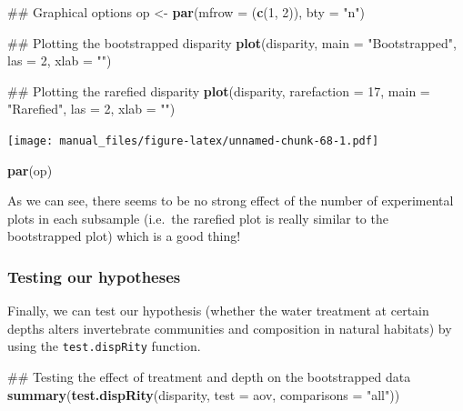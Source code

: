 \documentclass[]{book}
\newenvironment{Shaded}{\begin{snugshade}}{\end{snugshade}}
\newcommand{\KeywordTok}[1]{\textcolor[rgb]{0.13,0.29,0.53}{\textbf{#1}}}
\newcommand{\DataTypeTok}[1]{\textcolor[rgb]{0.13,0.29,0.53}{#1}}
\newcommand{\DecValTok}[1]{\textcolor[rgb]{0.00,0.00,0.81}{#1}}
\newcommand{\StringTok}[1]{\textcolor[rgb]{0.31,0.60,0.02}{#1}}
\newcommand{\NormalTok}[1]{#1}
\theoremstyle{definition}
\theoremstyle{definition}
\theoremstyle{remark}
\begin{document}
\begin{Shaded}
\begin{Highlighting}[]
\NormalTok{## Graphical options}
\NormalTok{op <-}\StringTok{ }\KeywordTok{par}\NormalTok{(}\DataTypeTok{mfrow =}\NormalTok{ (}\KeywordTok{c}\NormalTok{(}\DecValTok{1}\NormalTok{, }\DecValTok{2}\NormalTok{)), }\DataTypeTok{bty =} \StringTok{"n"}\NormalTok{)}

\NormalTok{## Plotting the bootstrapped disparity}
\KeywordTok{plot}\NormalTok{(disparity, }\DataTypeTok{main =} \StringTok{"Bootstrapped"}\NormalTok{, }\DataTypeTok{las =} \DecValTok{2}\NormalTok{, }\DataTypeTok{xlab =} \StringTok{""}\NormalTok{)}

\NormalTok{## Plotting the rarefied disparity}
\KeywordTok{plot}\NormalTok{(disparity, }\DataTypeTok{rarefaction =} \DecValTok{17}\NormalTok{, }\DataTypeTok{main =} \StringTok{"Rarefied"}\NormalTok{, }\DataTypeTok{las =} \DecValTok{2}\NormalTok{, }\DataTypeTok{xlab =} \StringTok{""}\NormalTok{)}
\end{Highlighting}
\end{Shaded}

\texttt{[image: manual\_files/figure-latex/unnamed-chunk-68-1.pdf]}

\begin{Shaded}
\begin{Highlighting}[]
\KeywordTok{par}\NormalTok{(op)}
\end{Highlighting}
\end{Shaded}

As we can see, there seems to be no strong effect of the number of
experimental plots in each subsample (i.e.~the rarefied plot is really
similar to the bootstrapped plot) which is a good thing!

\subsubsection{Testing our hypotheses}\label{testing-our-hypotheses}

Finally, we can test our hypothesis (whether the water treatment at
certain depths alters invertebrate communities and composition in
natural habitats) by using the \texttt{test.dispRity} function.

\begin{Shaded}
\begin{Highlighting}[]
\NormalTok{## Testing the effect of treatment and depth on the bootstrapped data}
\KeywordTok{summary}\NormalTok{(}\KeywordTok{test.dispRity}\NormalTok{(disparity, }\DataTypeTok{test =}\NormalTok{ aov, }\DataTypeTok{comparisons =} \StringTok{"all"}\NormalTok{))}
\end{Highlighting}
\end{Shaded}
\end{document}
